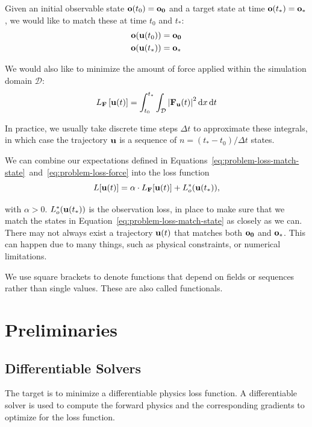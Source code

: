 \documentclass[acmtog]{techreportacmart}
\begin{document}
Given an initial observable state $\vb{o}(t_0) = \vb{o_0}$ and a target state
at time $\vb{o}(t_*) = \vb{o}_*$, we would like to match these at time $t_0$ and
$t_*$:
\begin{equation}
\begin{split}
  \label{eq:problem-loss-match-state}
  \vb{o}(\vb{u}(t_0)) &= \vb{o_0} \\ 
  \vb{o}(\vb{u}(t_*)) &= \vb{o_*}
\end{split}
\end{equation}

We would also like to minimize the amount of force applied within the
simulation domain $\mathcal{D}$:
\begin{equation}
  \label{eq:problem-loss-force}
  L_{\vb{F}}\left[ \vb{u}(t) \right] = 
  \int_{t_0}^{t_*}
    \int_{\mathcal{D}} \left| \vb{F}_{\vb{u}}(t)\right|^2  \dd{x}
  \dd{t}
\end{equation}

In practice, we usually take discrete time steps $\Delta t$ to approximate these
integrals, in which case the trajectory $\vb{u}$ is a sequence of $n = (t_*
- t_0)/\Delta t$ states.

We can combine our expectations defined in
Equations~\eqref{eq:problem-loss-match-state}~and~\eqref{eq:problem-loss-force}
into the loss function
\begin{equation}
  \label{eq:loss-function}
  L[\vb{u}(t)] = \alpha \cdot L_{\vb{F}}[\vb{u}(t)] + 
  L_o^*(\vb{u}(t_*)),
\end{equation}

with $\alpha > 0$. $L_o^*(\vb{u}(t_*))$ is the observation loss, in place to
make sure that we match the states in
Equation~\eqref{eq:problem-loss-match-state} as closely as we can. There may not
always exist a trajectory $\vb{u}(t)$ that matches both $\vb{o_0}$ and
$\vb{o_*}$. This can happen due to many things, such as physical constraints, or
numerical limitations. 

We use square brackets to denote functions that depend on fields or sequences
rather than single values. These are also called functionals. 

\section{Preliminaries}

\subsection{Differentiable Solvers}
The target is to minimize a differentiable physics loss function. 
A differentiable solver is used to compute the forward physics and the
corresponding gradients to optimize for the loss function. 
\end{document}
